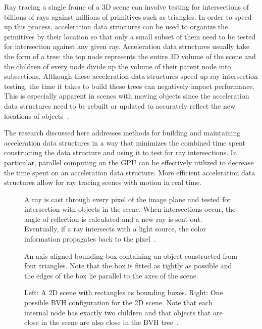 \documentclass{sig-alternate}
\begin{document}
Ray tracing a single frame of a 3D scene can involve testing for intersections of billions of rays against millions of primitives such as triangles. In order to speed up this process, acceleration data structures can be used to organize the primitives by their location so that only a small subset of them need to be tested for intersection against any given ray. Acceleration data structures usually take the form of a tree: the top node represents the entire 3D volume of the scene and the children of every node divide up the volume of their parent node into subsections. Although these acceleration data structures speed up ray intersection testing, the time it takes to build these trees can negatively impact performance. This is especially apparent in scenes with moving objects since the acceleration data structures need to be rebuilt or updated to accurately reflect the new locations of objects~\cite{Karras:2012}.

The research discussed here addresses methods for building and maintaining acceleration data structures in a way that minimizes the combined time spent constructing the data structure and using it to test for ray intersections. In particular, parallel computing on the GPU can be effectively utilized to decrease the time spent on an acceleration data structure. More efficient acceleration data structures allow for ray tracing scenes with motion in real time.

\begin{figure}
\centering
{}
\caption{A ray is cast through every pixel of the image plane and tested for intersection with objects in the scene. When intersections occur, the angle of reflection is calculated and a new ray is sent out. Eventually, if a ray intersects with a light source, the color information propagates back to the pixel~\cite{wiki:rayTracing}.}
\label{fig:ray_diagram}
\end{figure}

\begin{figure}
\centering
{}
\caption{An axis aligned bounding box containing an object constructed from four triangles. Note that the box is fitted as tightly as possible and the edges of the box lie parallel to the axes of the scene.}
\label{fig:AABB}
\end{figure}


\begin{figure*}
\centering
{}
\caption{Left: A 2D scene with rectangles as bounding boxes. Right: One possible BVH configuration for the 2D scene. Note that each internal node has exactly two children and that objects that are close in the scene are also close in the BVH tree~\cite{wiki:bvh}.}
\label{fig:BVH}
\end{figure*}
\end{document}
